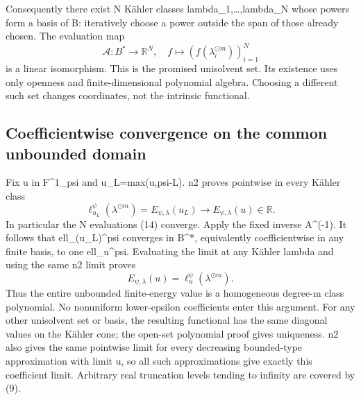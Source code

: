 \documentclass[
]{article}
\begin{document}
Consequently there exist N Kähler classes lambda\_1,\ldots,lambda\_N
whose powers form a basis of B: iteratively choose a power outside the
span of those already chosen. The evaluation map \[
\mathcal A:B^*\longrightarrow\mathbb R^N,\quad
f\longmapsto(f(\lambda_i^{\odot m}))_{i=1}^N\tag{14}
\] is a linear isomorphism. This is the promised unisolvent set. Its
existence uses only openness and finite-dimensional polynomial algebra.
Choosing a different such set changes coordinates, not the intrinsic
functional.

\subsection{Coefficientwise convergence on the common unbounded
domain}\label{coefficientwise-convergence-on-the-common-unbounded-domain}

Fix u in F\^{}1\_psi and u\_L=max(u,psi-L). n2 proves pointwise in every
Kähler class \[
\ell_{u_L}^\psi(\lambda^{\odot m})
=E_{\psi,\lambda}(u_L)\longrightarrow E_{\psi,\lambda}(u)\in\mathbb R.
\] In particular the N evaluations (14) converge. Apply the fixed
inverse A\^{}(-1). It follows that ell\_(u\_L)\^{}psi converges in
B\^{}*, equivalently coefficientwise in any finite basis, to one
ell\_u\^{}psi. Evaluating the limit at any Kähler lambda and using the
same n2 limit proves \[
E_{\psi,\lambda}(u)=\ell_u^\psi(\lambda^{\odot m}).\tag{15}
\] Thus the entire unbounded finite-energy value is a homogeneous
degree-m class polynomial. No nonuniform lower-epsilon coefficients
enter this argument. For any other unisolvent set or basis, the
resulting functional has the same diagonal values on the Kähler cone;
the open-set polynomial proof gives uniqueness. n2 also gives the same
pointwise limit for every decreasing bounded-type approximation with
limit u, so all such approximations give exactly this coefficient limit.
Arbitrary real truncation levels tending to infinity are covered by (9).
\end{document}
